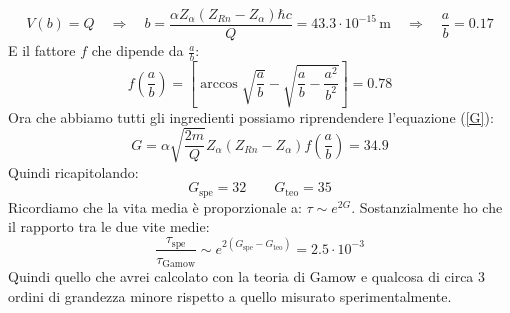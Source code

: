 \begin{equation}
    V(b)=Q \quad \Rightarrow \quad b=\frac{\alpha Z_\alpha(Z_{Rn}-Z_\alpha)\hbar c}{Q}=43.3\cdot 10^{-15}\,\mathrm{m} \quad \Rightarrow \quad \frac{a}{b}=0.17
\end{equation}
E il fattore $f$ che dipende da $\frac{a}{b}$:
\begin{equation}
    f\left(\frac{a}{b}\right)=\left[\arccos{\sqrt{\frac{a}{b}}}-\sqrt{\frac{a}{b}-\frac{a^2}{b^2}}\right]=0.78
\end{equation}
Ora che abbiamo tutti gli ingredienti possiamo riprendendere l'equazione (\ref{G}):
\begin{equation}
    G=\alpha\sqrt{\frac{2m}{Q}}Z_\alpha(Z_{Rn}-Z_\alpha)f\left(\frac{a}{b}\right)=34.9
\end{equation}
Quindi ricapitolando:
\begin{equation}
    G_{\text{spe}}=32 \qquad G_{\text{teo}}=35
\end{equation}
Ricordiamo che la vita media è proporzionale a: $\tau\sim e^{2G}$. Sostanzialmente ho che il rapporto tra le due vite medie:
\begin{equation}
    \frac{\tau_{\text{spe}}}{\tau_{\text{Gamow}}}\sim e^{2(G_{\text{spe}}-G_{\text{teo}})}=2.5\cdot10^{-3}
\end{equation}
Quindi quello che avrei calcolato con la teoria di Gamow e qualcosa di circa $3$ ordini di grandezza minore rispetto a quello misurato sperimentalmente.

